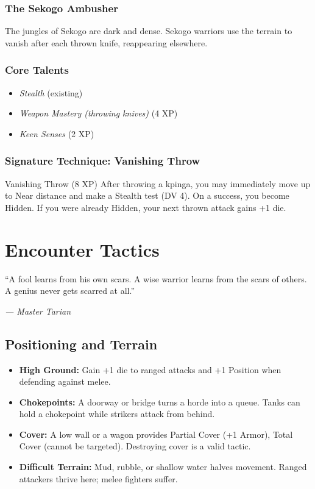 \documentclass[9pt,a5paper]{extbook}
\begin{document}
\subsection{The Sekogo Ambusher}

The jungles of Sekogo are dark and dense. Sekogo warriors use the terrain to vanish after each thrown knife, reappearing elsewhere.

\subsection{Core Talents}
\begin{itemize}
    \item \textit{Stealth} (existing)
    \item \textit{Weapon Mastery (throwing knives)} (4 XP)
    \item \textit{Keen Senses} (2 XP)
\end{itemize}

\subsection{Signature Technique: Vanishing Throw}

\begin{talentbox}{Vanishing Throw (8 XP)}
After throwing a kpinga, you may immediately move up to Near distance and make a Stealth test (DV 4). On a success, you become Hidden. If you were already Hidden, your next thrown attack gains +1 die.
\end{talentbox}

\clearpage

\chapter{Encounter Tactics}
\epigraph{``A fool learns from his own scars. A wise warrior learns from the scars of others. A genius never gets scarred at all.''}{\textit{--- Master Tarian}}

\section{Positioning and Terrain}

\begin{itemize}
    \item \textbf{High Ground:} Gain +1 die to ranged attacks and +1 Position when defending against melee.
    \item \textbf{Chokepoints:} A doorway or bridge turns a horde into a queue. Tanks can hold a chokepoint while strikers attack from behind.
    \item \textbf{Cover:} A low wall or a wagon provides Partial Cover (+1 Armor), Total Cover (cannot be targeted). Destroying cover is a valid tactic.
    \item \textbf{Difficult Terrain:} Mud, rubble, or shallow water halves movement. Ranged attackers thrive here; melee fighters suffer.
\end{itemize}
\end{document}
